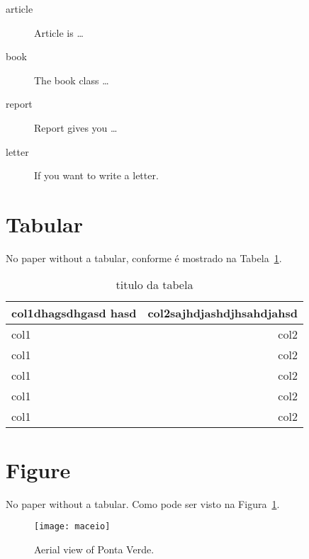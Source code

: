 \documentclass[12pt, a4paper, twoside, titlepage]{article}
\begin{document}

 \begin{description}
 	\item[article\label{article}] {Article is \ldots}
 	\item[book\label{book}]       {The book class \ldots}
 	\item[report\label{report}]   {Report gives you \ldots}
 	\item[letter\label{letter}]   {If you want to write a letter.}
 \end{description}

\section{Tabular}
No paper without a tabular, conforme é mostrado na Tabela~\ref{tab:novatabela}.

\begin{table}
	\caption{titulo da tabela}
	\label{tab:novatabela}
	\centering
	\begin{tabular}{p{5cm}|r}
		\hline
		\hline
		col1dhagsdhgasd hasd  & col2sajhdjashdjhsahdjahsd\\
		\hline
		col1  & col2\\
		\hline
		col1  & col2\\
		\hline
		col1  & col2\\
		\hline
		col1  & col2\\
		\hline
		col1  & col2\\
		\hline
		\hline
	\end{tabular} 
\end{table}


\section{Figure}
No paper without a tabular. Como pode ser visto na Figura~\ref{fig:maceio}.

\begin{figure}[h]
	\centering
 	\texttt{[image: maceio]}
 	\caption{Aerial view of Ponta Verde.}
 	\label{fig:maceio}
\end{figure} 
\end{document}
